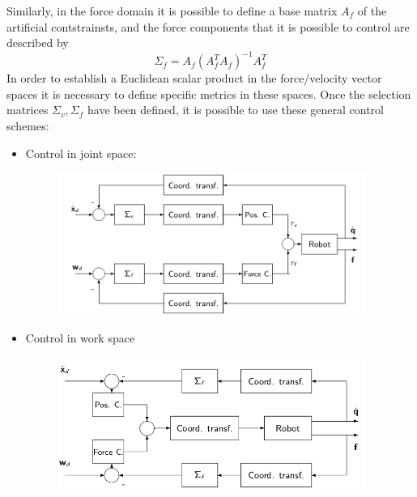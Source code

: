 \documentclass{book}
\begin{document}
Similarly, in the force domain it is possible to define a base matrix $A_f$ of the artificial contstrainsts, and the force components that it is possible to control are described by 
\[
    \Sigma_f=A_f(A_f^TA_f)^{-1}A_f^T
\]
In order to establish a Euclidean scalar product in the force/velocity vector spaces it is necessary to define specific metrics in these spaces. 
Once the selection matrices $\Sigma_v,\Sigma_f$ have been defined, it is possible to use these general control schemes: 
\begin{itemize}
    \item Control in joint space: 
        \begin{figure}[H]
            \begin{center}
                \includegraphics[width=0.95\textwidth]{hybridjspace}
            \end{center}
            \label{fig:}
        \end{figure}
    \item Control in work space 
        \begin{figure}[H]
            \begin{center}
                \includegraphics[width=0.95\textwidth]{hybridwspace}
            \end{center}
            \label{fig:}
        \end{figure}
\end{itemize}
\end{document}
